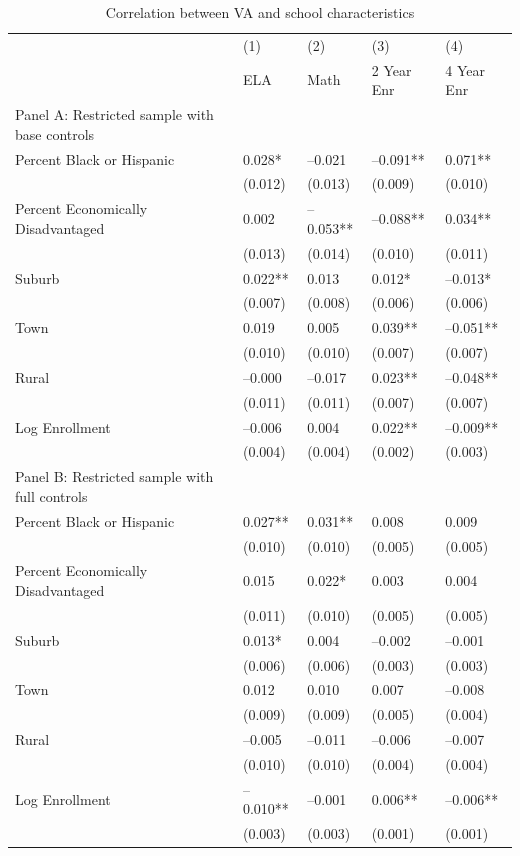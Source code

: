 \documentclass{article}
\begin{document}
\begin{table}[tbp] \centering
{}

\caption{Correlation between VA and school characteristics}
{\footnotesize
\begin{tabularx}{\linewidth}{lCCCC}

\toprule
&{(1)}&{(2)}&{(3)}&{(4)} \tabularnewline
{} & ELA & Math & 2 Year Enr & 4 Year Enr \tabularnewline
\midrule \addlinespace[\belowrulesep]
Panel A: Restricted sample with base controls&&&& \tabularnewline
\midrule Percent Black or Hispanic&0.028*&--0.021&--0.091**&0.071** \tabularnewline
&(0.012)&(0.013)&(0.009)&(0.010) \tabularnewline
\midrule Percent Economically Disadvantaged&0.002&--0.053**&--0.088**&0.034** \tabularnewline
&(0.013)&(0.014)&(0.010)&(0.011) \tabularnewline
\midrule Suburb&0.022**&0.013&0.012*&--0.013* \tabularnewline
&(0.007)&(0.008)&(0.006)&(0.006) \tabularnewline
Town&0.019&0.005&0.039**&--0.051** \tabularnewline
&(0.010)&(0.010)&(0.007)&(0.007) \tabularnewline
Rural&--0.000&--0.017&0.023**&--0.048** \tabularnewline
&(0.011)&(0.011)&(0.007)&(0.007) \tabularnewline
\midrule Log Enrollment&--0.006&0.004&0.022**&--0.009** \tabularnewline
&(0.004)&(0.004)&(0.002)&(0.003) \tabularnewline
\midrule \midrule Panel B: Restricted sample with full controls&&&& \tabularnewline
\midrule Percent Black or Hispanic&0.027**&0.031**&0.008&0.009 \tabularnewline
&(0.010)&(0.010)&(0.005)&(0.005) \tabularnewline
\midrule Percent Economically Disadvantaged&0.015&0.022*&0.003&0.004 \tabularnewline
&(0.011)&(0.010)&(0.005)&(0.005) \tabularnewline
\midrule Suburb&0.013*&0.004&--0.002&--0.001 \tabularnewline
&(0.006)&(0.006)&(0.003)&(0.003) \tabularnewline
Town&0.012&0.010&0.007&--0.008 \tabularnewline
&(0.009)&(0.009)&(0.005)&(0.004) \tabularnewline
Rural&--0.005&--0.011&--0.006&--0.007 \tabularnewline
&(0.010)&(0.010)&(0.004)&(0.004) \tabularnewline
\midrule Log Enrollment&--0.010**&--0.001&0.006**&--0.006** \tabularnewline
&(0.003)&(0.003)&(0.001)&(0.001) \tabularnewline
\bottomrule 

\end{tabularx}
}
\end{table}
\end{document}
